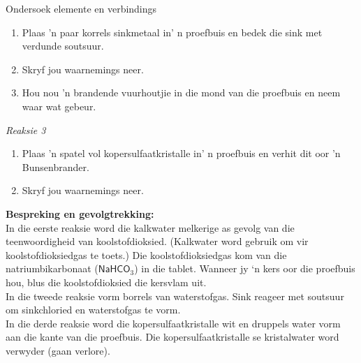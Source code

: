 \begin{g_experiment}{Ondersoek elemente en verbindings}
\begin{enumerate}[label=\textbf{\arabic*}.]
\item Plaas 'n paar korrels sinkmetaal in' n proefbuis en bedek die sink met verdunde soutsuur.
\item Skryf jou waarnemings neer.
\item Hou nou 'n brandende vuurhoutjie in die mond van die proefbuis en neem waar wat gebeur. 
\end{enumerate}
\textsl{Reaksie 3}\\
\begin{enumerate}[label=\textbf{\arabic*}.]
\item Plaas 'n spatel vol kopersulfaatkristalle in' n proefbuis en verhit dit oor 'n Bunsenbrander.
\item Skryf jou waarnemings neer.
\end{enumerate}
\textbf{Bespreking en gevolgtrekking:}\\
 In die eerste reaksie word die kalkwater melkerige as gevolg van die teenwoordigheid van koolstofdioksied. (Kalkwater word gebruik om vir koolstofdioksiedgas te toets.) Die koolstofdioksiedgas kom van die natriumbikarbonaat ($\textsf{NaHCO}_3$) in die tablet. Wanneer jy ‘n kers oor die proefbuis hou, blus die koolstofdioksied die kersvlam uit.\\
In die tweede reaksie vorm borrels van waterstofgas. Sink reageer met soutsuur om sinkchloried en waterstofgas te vorm. \\
In die derde reaksie word die kopersulfaatkristalle wit en druppels water vorm aan die kante van die proefbuis. Die kopersulfaatkristalle se kristalwater word verwyder (gaan verlore).
\end{g_experiment}


